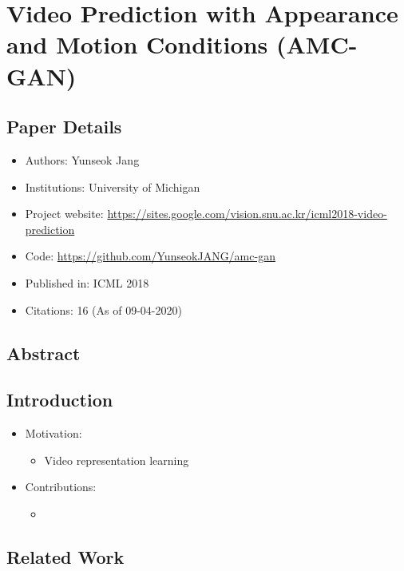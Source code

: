 \documentclass{article}
\begin{document}
    \section{Video Prediction with Appearance and Motion Conditions (AMC-GAN)}\label{sec:Video_Prediction_with_Appearance_and_Motion_Conditions_(AMC_GAN)}
    \subsection*{Paper Details}
    \begin{itemize}
        \item Authors: Yunseok Jang
        \item Institutions: University of Michigan
        \item Project website: \url{https://sites.google.com/vision.snu.ac.kr/icml2018-video-prediction}
        \item Code: \url{https://github.com/YunseokJANG/amc-gan}
        \item Published in: ICML 2018
        \item Citations: 16 (As of 09-04-2020)
    \end{itemize}

    \subsection*{Abstract}

    \subsection{Introduction}\label{subsec:Video_Prediction_with_Appearance_and_Motion_Conditions_(AMC_GAN):introduction}
    \begin{itemize}
        \item Motivation:
        \begin{itemize}
            \item Video representation learning
        \end{itemize}
        \item Contributions:
        \begin{itemize}
            \item
        \end{itemize}
    \end{itemize}

    \subsection{Related Work}\label{subsec:Video_Prediction_with_Appearance_and_Motion_Conditions_(AMC_GAN):related-work}
\end{document}
